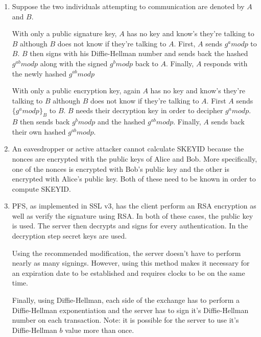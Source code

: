 \documentclass[11pt]{article}
\begin{document}
\begin{enumerate}
\item 

Suppose the two individuals attempting to communication are denoted by $A$ and $B$.  

With only a public signature key, $A$ has no key and know's they're talking to $B$ although $B$ does not know if they're talking to $A$.  First, $A$ sends $g^a mod p$ to $B$.  $B$ then signs with his Diffie-Hellman number and sends back the hashed $g^{ab}mod p$ along with the signed $g^b mod p$ back to $A$.  Finally, $A$ responds with the newly hashed $g^{ab}mod p$

With only a public encryption key, again $A$ has no key and know's they're talking to $B$ although $B$ does not know if they're talking to $A$.  First $A$ sends $\{ g^a mod p \}_{B}$ to $B$.  $B$ needs their decryption key in order to decipher $g^a mod p$.  $B$ then sends back $g^b mod p$ and the hashed $g^{ab}mod p$.  Finally, $A$ sends back their own hashed $g^{ab}mod p$.  

\item 

An eavesdropper or active attacker cannot calculate SKEYID because the nonces are encrypted with the public keys of Alice and Bob.  More specifically, one of the nonces is encrypted with Bob's public key and the other is encrypted with Alice's public key.  Both of these need to be known in order to compute SKEYID.  

\item 

PFS, as implemented in SSL v3, has the client perform an RSA encryption as well as verify the signature using RSA.  In both of these cases, the public key is used.  The server then decrypts and signs for every authentication.  In the decryption step secret keys are used.  

Using the recommended modification, the server doesn't have to perform nearly as many signings.  However, using this method makes it necessary for an expiration date to be established and requires clocks to be on the same time.  

Finally, using Diffie-Hellman, each side of the exchange has to perform a Diffie-Hellman exponentiation and the server has to sign it's Diffie-Hellman number on each transaction.  Note: it is possible for the server to use it's Diffie-Hellman $b$ value more than once.  

\end{enumerate}
\end{document}
